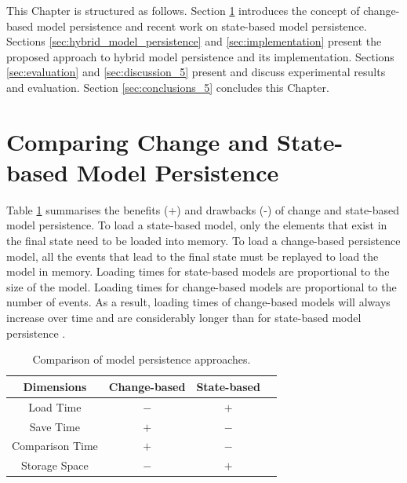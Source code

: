 This Chapter is structured as follows. Section \ref{sec:change_and_state_based_model_persistence} introduces the concept of change-based model persistence and recent work on state-based model persistence. Sections \ref{sec:hybrid_model_persistence} and \ref{sec:implementation} present the proposed approach to hybrid model persistence and its implementation. Sections \ref{sec:evaluation} and \ref{sec:discussion_5} present and discuss experimental results and evaluation. Section \ref{sec:conclusions_5} concludes this Chapter.

\section{Comparing Change and State-based Model Persistence}
\label{sec:change_and_state_based_model_persistence}
Table \ref{table:persistence_comparsion} summarises the benefits (+) and drawbacks (-) of change and state-based model persistence. To load a state-based model, only the elements that exist in the final state need to be loaded into memory. To load a change-based persistence model, all the events that lead to the final state must be replayed to load the model in memory. Loading times for state-based models are proportional to the size of the model. Loading times for change-based models are proportional to the number of events. As a result, loading times of change-based models will always increase over time and are considerably longer than for state-based model persistence \cite{yohannis2018towards,mens2002state}. 

\begin{table}[ht]
  \caption{Comparison of model persistence approaches.}
  \label{table:persistence_comparsion}
  \centering
  \begin{small}
    \begin{tabular}{ c c c c }
      \hline 
      \textbf{Dimensions} & \textbf{Change-based} & \textbf{State-based} \\
      \hline 
      Load Time & $-$ & $+$ \\
      Save Time & $+$ & $-$ \\
      Comparison Time & $+$ & $-$ \\
      Storage Space & $-$ & $+$ \\
      \hline 
    \end{tabular}
  \end{small}
\end{table}

